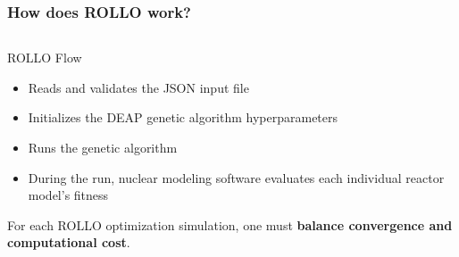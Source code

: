 \begin{frame}
    \frametitle{How does ROLLO work?}
    \begin{columns}
        \begin{column}{0.7\textwidth}
            \vspace{-0.5cm}
            ROLLO Flow 
            \begin{itemize}
                \item Reads and validates the JSON input file
                \item Initializes the \acrfull{DEAP} genetic algorithm hyperparameters
                \item Runs the genetic algorithm  
                \item During the run, nuclear modeling software evaluates each individual 
                reactor model's fitness
            \end{itemize}

            \vspace{0.2cm}
            For each ROLLO optimization simulation, one must \textbf{balance convergence and 
            computational cost}. 


\end{column}
\end{columns}
\end{frame}

